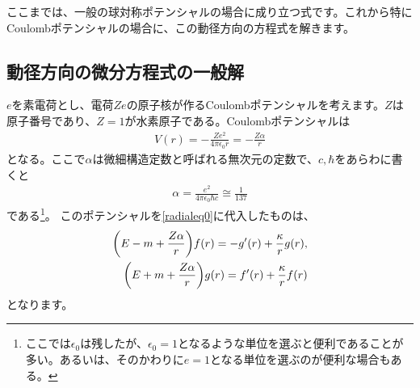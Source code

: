 \documentclass[report,paper=a4, fontsize=12pt, line_length=16cm, number_of_lines=33,dvipdfmx]{jlreq}
\numberwithin{equation}{chapter}
\begin{document}
ここまでは、一般の球対称ポテンシャルの場合に成り立つ式です。これから特にCoulombポテンシャルの場合に、この動径方向の方程式を解きます。

\subsection{動径方向の微分方程式の一般解}
$e$を素電荷とし、電荷$Ze$の原子核が作るCoulombポテンシャルを考えます。$Z$は原子番号であり、$Z=1$が水素原子である。Coulombポテンシャルは
\begin{align}
  V(r)=-\frac{Ze^2}{4\pi\epsilon_0 r}=-\frac{Z\alpha}{r}
\end{align}
となる。ここで$\alpha$は微細構造定数と呼ばれる無次元の定数で、$c,\hbar$をあらわに書くと
\begin{align}
  \alpha=\frac{e^2}{4\pi\epsilon_0\hbar c}\cong \frac{1}{137}
\end{align}
である\footnote{ここでは$\epsilon_0$は残したが、$\epsilon_0=1$となるような単位を選ぶと便利であることが多い。あるいは、そのかわりに$e=1$となる単位を選ぶのが便利な場合もある。}。
このポテンシャルを\eqref{radialeq0}に代入したものは、
\begin{align}
  \qty(E-m+\frac{Z\alpha}{r})f(r)=-g'(r)+\frac{\kappa}{r}g(r),\\
  \qty(E+m+\frac{Z\alpha}{r})g(r)=f'(r)+\frac{\kappa}{r}f(r)  \label{radialeq}  
\end{align}
となります。
\end{document}
